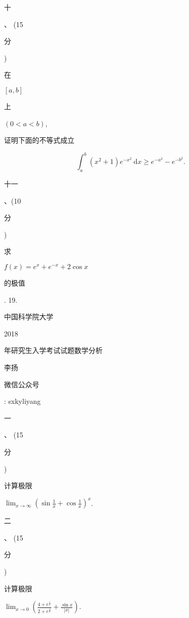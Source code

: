 \documentclass[10pt]{article}
\begin{document}
\begin{CJK}{UTF8}{mj}十\end{CJK}、 (15 \begin{CJK}{UTF8}{mj}分\end{CJK}) \begin{CJK}{UTF8}{mj}在\end{CJK} $[a, b]$ \begin{CJK}{UTF8}{mj}上\end{CJK} $(0<a<b)$, \begin{CJK}{UTF8}{mj}证明下面的不等式成立\end{CJK}
$$
\int_{a}^{b}\left(x^{2}+1\right) e^{-x^{2}} \mathrm{~d} x \geq e^{-a^{2}}-e^{-b^{2}} .
$$
\begin{CJK}{UTF8}{mj}十一\end{CJK}、(10 \begin{CJK}{UTF8}{mj}分\end{CJK}) \begin{CJK}{UTF8}{mj}求\end{CJK} $f(x)=e^{x}+e^{-x}+2 \cos x$ \begin{CJK}{UTF8}{mj}的极值\end{CJK}. 19. \begin{CJK}{UTF8}{mj}中国科学院大学\end{CJK} 2018 \begin{CJK}{UTF8}{mj}年研究生入学考试试题数学分析\end{CJK}

\begin{CJK}{UTF8}{mj}李扬\end{CJK}

\begin{CJK}{UTF8}{mj}微信公众号\end{CJK}: sxkyliyang

\begin{CJK}{UTF8}{mj}一\end{CJK}、 (15 \begin{CJK}{UTF8}{mj}分\end{CJK}) \begin{CJK}{UTF8}{mj}计算极限\end{CJK} $\lim _{x \rightarrow \infty}\left(\sin \frac{1}{x}+\cos \frac{1}{x}\right)^{x}$.

\begin{CJK}{UTF8}{mj}二\end{CJK}、 (15 \begin{CJK}{UTF8}{mj}分\end{CJK}) \begin{CJK}{UTF8}{mj}计算极限\end{CJK} $\lim _{x \rightarrow 0}\left(\frac{4+e^{\frac{1}{x}}}{2+e^{\frac{4}{x}}}+\frac{\sin x}{|x|}\right)$.
\end{document}
